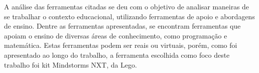 	A análise das ferramentas citadas se deu com o objetivo de analisar maneiras de se trabalhar o contexto educacional, utilizando ferramentas de apoio e abordagens de ensino. Dentre as ferramentas apresentadas, se encontram ferramentas que apoiam o ensino de diversas áreas de conhecimento, como programação e matemática. Estas ferramentas podem ser reais ou virtuais, porém, como foi apresentado ao longo do trabalho, a ferramenta escolhida como foco deste trabalho foi kit Mindstorms NXT, da Lego.



